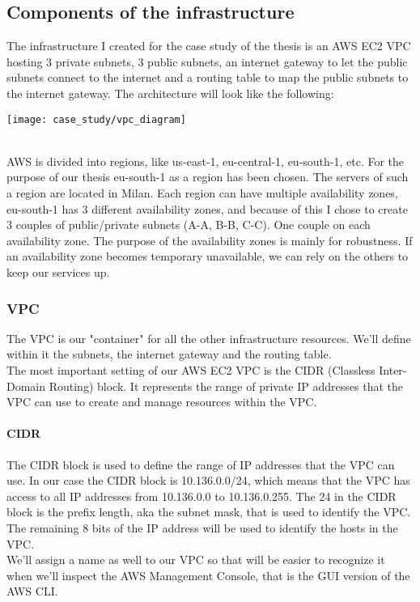 \subsection{Components of the infrastructure}
The infrastructure I created for the case study of the thesis is an AWS EC2 \gls{VPC} hosting 3 private \gls{subnet}s, 3 public subnets, an \gls{internet gateway} to let the public subnets connect to the internet and a \gls{routing table} to map the public subnets to the internet gateway.
The architecture will look like the following:
\begin{center}
  \texttt{[image: case\_study/vpc\_diagram]} 
\end{center}\mbox{}\\
AWS is divided into regions, like us-east-1, eu-central-1, eu-south-1, etc.
For the purpose of our thesis eu-south-1 as a region has been chosen.
The servers of such a region are located in Milan.
Each region can have multiple availability zones, eu-south-1 has 3 different availability zones, and because of this I chose to create 3 couples of public/private subnets (A-A, B-B, C-C).
One couple on each availability zone.
The purpose of the availability zones is mainly for robustness.
If an availability zone becomes temporary unavailable, we can rely on the others to keep our services up.


\subsubsection{VPC}
The VPC is our "container" for all the other infrastructure resources.
We'll define within it the subnets, the internet gateway and the routing table.\\
The most important setting of our AWS EC2 VPC is the CIDR (Classless Inter-Domain Routing) block.
It represents the range of private IP addresses that the VPC can use to create and manage resources within the VPC.
\paragraph{CIDR}
The CIDR block is used to define the range of IP addresses that the VPC can use.
In our case the CIDR block is 10.136.0.0/24, which means that the VPC has access to all IP addresses from 10.136.0.0 to 10.136.0.255.
The 24 in the CIDR block is the prefix length, aka the subnet mask, that is used to identify the VPC.
The remaining 8 bits of the IP address will be used to identify the hosts in the VPC.\\
We'll assign a name as well to our VPC so that will be easier to recognize it when we'll inspect the AWS Management Console, that is the GUI version of the AWS CLI.

